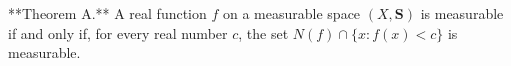 **Theorem A.** A real function $f$ on a measurable space $(X,\mathbf{S})$ is measurable if and only if, for every real number $c$, the set $N(f) \cap \{x : f(x) < c\}$ is measurable.
